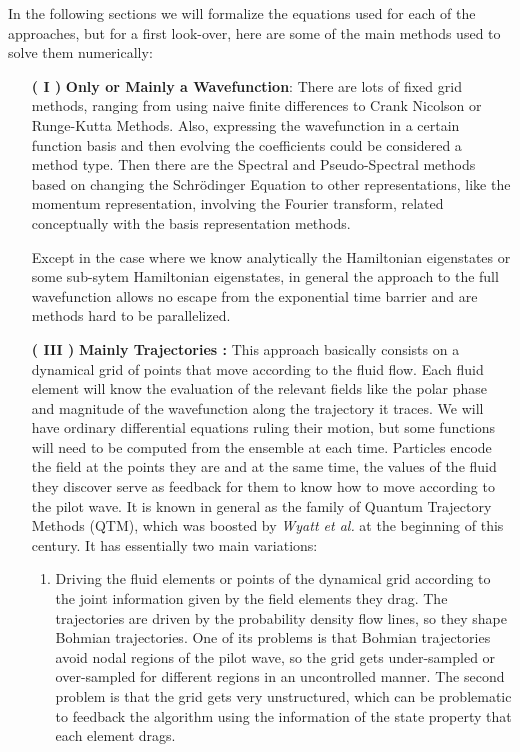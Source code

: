 \documentclass[11pt, a4paper]{article} %
\begin{document}
In the following sections we will formalize the equations used for each of the approaches, but for a first look-over, here are some of the main methods used to solve them numerically:
\begin{enumerate}
\item[\bf ( I )] {\bf Only or Mainly a Wavefunction}: There are lots of fixed grid methods, ranging from using naive finite differences to Crank Nicolson or Runge-Kutta Methods. Also, expressing the wavefunction in a certain function basis and then evolving the coefficients could be considered a method type. Then there are the Spectral and Pseudo-Spectral methods based on changing the Schrödinger Equation to other representations, like the momentum representation, involving the Fourier transform, related conceptually with the basis representation methods. 

Except in the case where we know analytically the Hamiltonian eigenstates or some sub-sytem Hamiltonian eigenstates, in general the approach to the full wavefunction allows no escape from the exponential time barrier and are methods hard to be parallelized.

\item [\bf ( III )] {\bf Mainly Trajectories :} This approach basically consists on a dynamical grid of points that move according to the fluid flow. Each fluid element will know the evaluation of the relevant fields like the polar phase and magnitude of the wavefunction along the trajectory it traces. We will have ordinary differential equations ruling their motion, but some functions will need to be computed from the ensemble at each time. Particles encode the field at the points they are and at the same time, the values of the fluid they discover serve as feedback for them to know how to move according to the pilot wave. It is known in general as the family of Quantum Trajectory Methods (QTM), which was boosted by {\em Wyatt et al.} at the beginning of this century. It has essentially two main variations:
\begin{enumerate}
\item Driving the fluid elements or points of the dynamical grid  according to the joint information given by the field elements they drag. The trajectories are driven by the probability density flow lines, so they shape Bohmian trajectories. One of its problems is that Bohmian trajectories avoid nodal regions of the pilot wave, so the grid gets under-sampled or over-sampled for different regions in an uncontrolled manner. The second problem is that the grid gets very unstructured, which can be problematic to feedback the algorithm using the information of the state property that each element drags.


\end{enumerate}
\end{enumerate}
\end{document}
